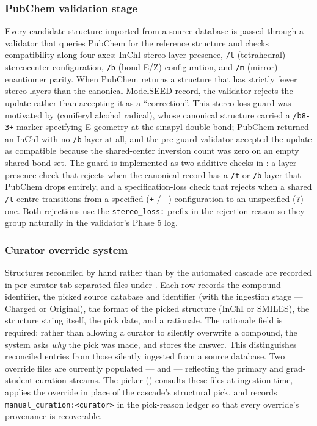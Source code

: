 \subsubsection{PubChem validation stage}

Every candidate structure imported from a source database is passed through a
validator that queries PubChem for the reference structure and checks
compatibility along four axes: InChI stereo layer presence, \texttt{/t}
(tetrahedral) stereocenter configuration, \texttt{/b} (bond E/Z) configuration,
and \texttt{/m} (mirror) enantiomer parity. When PubChem returns a structure
that has strictly fewer stereo layers than the canonical ModelSEED record, the
validator rejects the update rather than accepting it as a ``correction''. This
stereo-loss guard was motivated by  (coniferyl alcohol radical),
whose canonical structure carried a \texttt{/b8-3+} marker specifying E geometry
at the sinapyl double bond; PubChem returned an InChI with no \texttt{/b} layer
at all, and the pre-guard validator accepted the update as compatible because
the shared-center inversion count was zero on an empty shared-bond set. The
guard is implemented as two additive checks in
: a
layer-presence check that rejects when the canonical record has a \texttt{/t} or
\texttt{/b} layer that PubChem drops entirely, and a specification-loss check
that rejects when a shared \texttt{/t} centre transitions from a specified
(\texttt{+} / \texttt{-}) configuration to an unspecified (\texttt{?}) one. Both
rejections use the \texttt{stereo\_loss:} prefix in the rejection reason so they
group naturally in the validator's Phase 5 log.

\subsubsection{Curator override system}

Structures reconciled by hand rather than by the automated cascade are recorded
in per-curator tab-separated files under
.
Each row records the compound identifier, the picked source database and
identifier (with the ingestion stage --- Charged or Original), the format of the
picked structure (InChI or SMILES), the structure string itself, the pick date,
and a rationale. The rationale field is required: rather than allowing a curator
to silently overwrite a compound, the system asks \textit{why} the pick was
made, and stores the answer. This distinguishes reconciled entries from those
silently ingested from a source database. Two override files are currently
populated ---  and  --- reflecting the
primary and grad-student curation streams. The picker
() consults these files at ingestion time,
applies the override in place of the cascade's structural pick, and records
\texttt{manual\_curation:\textless curator\textgreater} in the pick-reason
ledger so that every override's provenance is recoverable.

